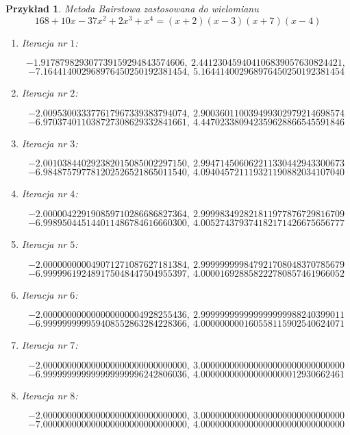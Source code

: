 \documentclass{article}
\newtheorem{przyklad}{Przykład}
\begin{document}
\begin{przyklad}
Metoda Bairstowa zastosowana do wielomianu $$168 + 10x - 37x^2 + 2x^3 + x^4 = (x+2)(x-3)(x+7)(x-4)$$

\begin{enumerate}
\item Iteracja nr $1$:

$$-1.917879829307739159294843574606, \
2.441230459404106839057630824421,$$
$$-7.164414002968976450250192381454, \
5.164414002968976450250192381454$$	

\item Iteracja nr $2$:

$$-2.009530033377617967339383794074, \
2.900360110039499302979214698574
$$$$-6.970374011038727308629332841661,  \ 
4.447023380942359628866545591846
$$

\item Iteracja nr $3$:

$$
-2.001038440292382015085002297150, \
2.994714506062211330442943300673
$$
$$
-6.984875797781202526521865011540, \
4.094045721119321190882034107040
$$

\item Iteracja nr $4$:

$$
-2.000004229190859710286686827364, \
2.999983492821811977876729816709$$
$$-6.998950445144011486784616660300, \
4.005274379374182171426675656777$$


\item Iteracja nr $5$:

$$-2.000000000049071271087627181384, \ 
2.999999999847921708048370785679$$
$$-6.999996192489175048447504955397, \ 
4.000016928858222780857461966052
$$

\item Iteracja nr $6$:

$$-2.000000000000000000004928255436, \
2.999999999999999999988240399011$$
$$-6.999999999959408552863284228366, \
4.000000000160558115902540624071$$

\item Iteracja nr $7$:

$$-2.000000000000000000000000000000, \
3.000000000000000000000000000000$$
$$-6.999999999999999999996242806036, \
4.000000000000000000012930662461
$$

\item Iteracja nr $8$:

$$-2.000000000000000000000000000000, \
3.000000000000000000000000000000$$
$$-7.000000000000000000000000000000, \
4.000000000000000000000000000000$$

\end{enumerate}

\end{przyklad}
\end{document}

